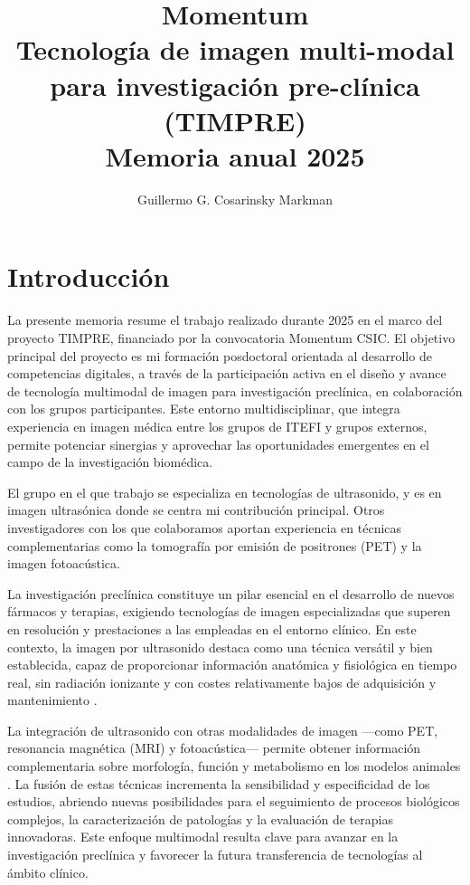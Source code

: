 \documentclass[10pt,a4paper]{article}
\title{Momentum \\ Tecnología de imagen multi-modal para investigación pre-clínica (TIMPRE) \\ Memoria anual 2025}
\author{Guillermo G. Cosarinsky Markman}
\date{}
\begin{document}
	
\maketitle

\tableofcontents

\section{Introducción}\label{sec:intro}
La presente memoria resume el trabajo realizado durante 2025 en el marco del proyecto TIMPRE, financiado por la convocatoria Momentum CSIC. El objetivo principal del proyecto es mi formación posdoctoral orientada al desarrollo de competencias digitales, a través de la participación activa en el diseño y avance de tecnología multimodal de imagen para investigación preclínica, en colaboración con los grupos participantes. Este entorno multidisciplinar, que integra experiencia en imagen médica entre los grupos de ITEFI y grupos externos, permite potenciar sinergias y aprovechar las oportunidades emergentes en el campo de la investigación biomédica.

El grupo en el que trabajo se especializa en tecnologías de ultrasonido, y es en imagen ultrasónica donde se centra mi contribución principal. Otros investigadores con los que colaboramos aportan experiencia en técnicas complementarias como la tomografía por emisión de positrones (PET) y la imagen fotoacústica.

La investigación preclínica constituye un pilar esencial en el desarrollo de nuevos fármacos y terapias, exigiendo tecnologías de imagen especializadas que superen en resolución y prestaciones a las empleadas en el entorno clínico. En este contexto, la imagen por ultrasonido destaca como una técnica versátil y bien establecida, capaz de proporcionar información anatómica y fisiológica en tiempo real, sin radiación ionizante y con costes relativamente bajos de adquisición y mantenimiento \cite{Moran2020}.

La integración de ultrasonido con otras modalidades de imagen —como PET, resonancia magnética (MRI) y fotoacústica— permite obtener información complementaria sobre morfología, función y metabolismo en los modelos animales \cite{Wu2018, Rovera2025}. La fusión de estas técnicas incrementa la sensibilidad y especificidad de los estudios, abriendo nuevas posibilidades para el seguimiento de procesos biológicos complejos, la caracterización de patologías y la evaluación de terapias innovadoras. Este enfoque multimodal resulta clave para avanzar en la investigación preclínica y favorecer la futura transferencia de tecnologías al ámbito clínico.
\end{document}
